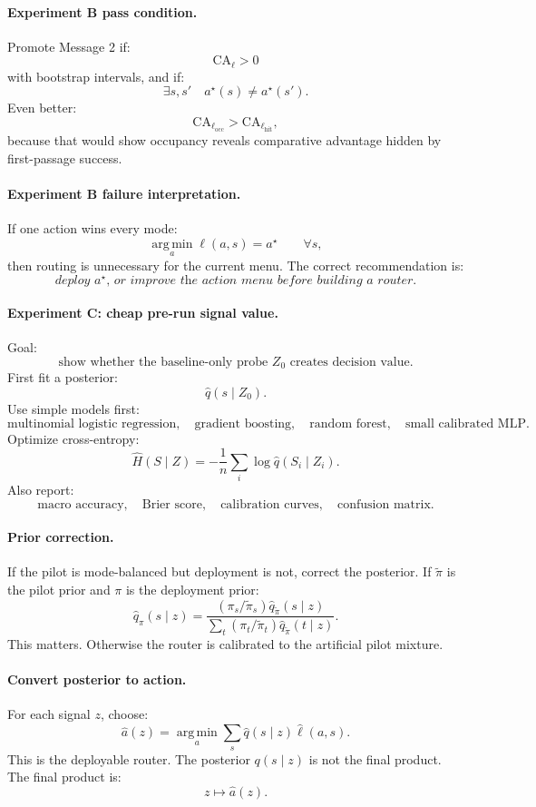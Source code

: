 \documentclass{article}
\providecommand{\argmin}{\operatorname*{arg\,min}}
\begin{document}
\paragraph{Experiment B pass condition.}
Promote Message 2 if:
\[
    \mathrm{CA}_{\ell}>0
\]
with bootstrap intervals, and if:
\[
    \exists s,s'\quad a^\star(s)\neq a^\star(s').
\]
Even better:
\[
    \mathrm{CA}_{\ell_{\mathrm{occ}}}
    >
    \mathrm{CA}_{\ell_{\mathrm{hit}}},
\]
because that would show occupancy reveals comparative advantage hidden by first-passage success.

\paragraph{Experiment B failure interpretation.}
If one action wins every mode:
\[
    \argmin_a\ell(a,s)=a^\star
    \qquad\forall s,
\]
then routing is unnecessary for the current menu.
The correct recommendation is:
\[
    \textit{deploy \(a^\star\), or improve the action menu before building a router.}
\]

\paragraph{Experiment C: cheap pre-run signal value.}
Goal:
\[
    \text{show whether the baseline-only probe \(Z_0\) creates decision value.}
\]
First fit a posterior:
\[
    \hat q(s\mid Z_0).
\]
Use simple models first:
\[
    \text{multinomial logistic regression},
    \quad
    \text{gradient boosting},
    \quad
    \text{random forest},
    \quad
    \text{small calibrated MLP}.
\]
Optimize cross-entropy:
\[
    \widehat H(S\mid Z)
    =
    -\frac1n\sum_i\log \hat q(S_i\mid Z_i).
\]
Also report:
\[
    \text{macro accuracy},
    \quad
    \text{Brier score},
    \quad
    \text{calibration curves},
    \quad
    \text{confusion matrix}.
\]

\paragraph{Prior correction.}
If the pilot is mode-balanced but deployment is not, correct the posterior.
If \(\tilde\pi\) is the pilot prior and \(\pi\) is the deployment prior:
\[
    \hat q_\pi(s\mid z)
    =
    \frac{(\pi_s/\tilde\pi_s)\hat q_{\tilde\pi}(s\mid z)}
    {\sum_t(\pi_t/\tilde\pi_t)\hat q_{\tilde\pi}(t\mid z)}.
\]
This matters.
Otherwise the router is calibrated to the artificial pilot mixture.

\paragraph{Convert posterior to action.}
For each signal \(z\), choose:
\[
    \hat a(z)
    =
    \argmin_a\sum_s\hat q(s\mid z)\hat\ell(a,s).
\]
This is the deployable router.
The posterior \(q(s\mid z)\) is not the final product.
The final product is:
\[
    z\mapsto \hat a(z).
\]
\end{document}
